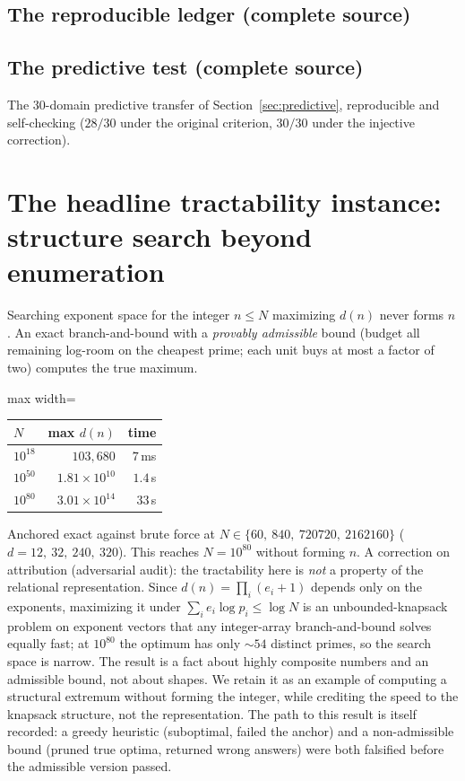 \documentclass[11pt]{article}
\begin{document}
\subsection{The reproducible ledger (complete source)}


\subsection{The predictive test (complete source)}
The $30$-domain predictive transfer of Section~\ref{sec:predictive}, reproducible and self-checking
($28/30$ under the original criterion, $30/30$ under the injective correction).


\section{The headline tractability instance: structure search beyond enumeration}

Searching exponent space for the integer $n\le N$ maximizing $d(n)$ never forms $n$. An exact
branch-and-bound with a \emph{provably admissible} bound (budget all remaining log-room on the cheapest
prime; each unit buys at most a factor of two) computes the true maximum.

\begin{center}
\begin{adjustbox}{max width=\linewidth}\begin{tabular}{lrr}
\toprule
$N$ & max $d(n)$ & time \\
\midrule
$10^{18}$ & $103{,}680$ & $7$\,ms \\
$10^{50}$ & $1.81\times10^{10}$ & $1.4$\,s \\
$10^{80}$ & $3.01\times10^{14}$ & $33$\,s \\
\bottomrule
\end{tabular}\end{adjustbox}
\end{center}

\noindent Anchored exact against brute force at $N \in \{60,\ 840,\ 720720,\ 2162160\}$ ($d=12,\ 32,\ 240,\ 320$). This reaches $N=10^{80}$
without forming $n$. A correction on attribution (adversarial audit): the tractability here is \emph{not} a
property of the relational representation. Since $d(n)=\prod_i(e_i+1)$ depends only on the exponents,
maximizing it under $\sum_i e_i\log p_i\le\log N$ is an unbounded-knapsack problem on exponent vectors that
any integer-array branch-and-bound solves equally fast; at $10^{80}$ the optimum has only $\sim\!54$ distinct
primes, so the search space is narrow. The result is a fact about highly composite numbers and an admissible
bound, not about shapes. We retain it as an example of computing a structural extremum without forming the
integer, while crediting the speed to the knapsack structure, not the representation. The path to this result is itself recorded:
a greedy heuristic (suboptimal, failed the anchor) and a non-admissible bound (pruned true optima, returned
wrong answers) were both falsified before the admissible version passed.
\end{document}
